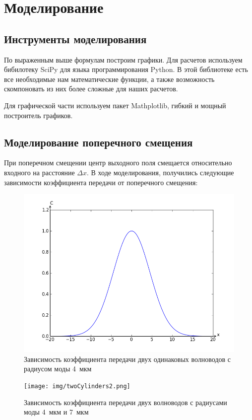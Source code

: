 \chapter{Моделирование}
\section{Инструменты моделирования}

По выраженным выше формулам построим графики. Для расчетов используем бибилотеку SciPy для языка программирования Python. В этой библиотеке есть все необходимые нам математические функции, а также возможность скомпоновать из них более сложные для наших расчетов.

Для графической части используем пакет Mathplotlib, гибкий и мощный построитель графиков. 

\section{Моделирование поперечного смещения}

При поперечном смещении центр выходного поля смещается относительно входного на расстояние $\Delta x$. В ходе моделирования, получились следующие зависимости коэффициента передачи от поперечного смещения:

\begin{figure}[ht!]
		\includegraphics[width=0.5\linewidth]{img/twoCylinders.png}
		\caption{Зависимость коэффициента передачи двух одинаковых волноводов с радиусом моды 4~мкм}
\end{figure}
\begin{figure}[ht!]
		\texttt{[image: img/twoCylinders2.png]}
		\caption{Зависимость коэффициента передачи двух волноводов с радиусами моды 4~мкм и 7~мкм}
\end{figure}